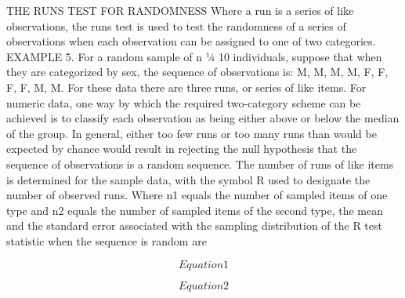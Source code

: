 THE RUNS TEST FOR RANDOMNESS
Where a run is a series of like observations, the runs test is used to test the randomness of a series of
observations when each observation can be assigned to one of two categories.
EXAMPLE 5. For a random sample of n ¼ 10 individuals, suppose that when they are categorized by sex, the sequence of
observations is: M, M, M, M, F, F, F, F, M, M. For these data there are three runs, or series of like items.
For numeric data, one way by which the required two-category scheme can be achieved is to classify each
observation as being either above or below the median of the group. In general, either too few runs or too many
runs than would be expected by chance would result in rejecting the null hypothesis that the sequence of
observations is a random sequence.
The number of runs of like items is determined for the sample data, with the symbol R used to designate the
number of observed runs. Where n1 equals the number of sampled items of one type and n2 equals the number of
sampled items of the second type, the mean and the standard error associated with the sampling distribution of
the R test statistic when the sequence is random are


\[ Equation 1 \]

\[ Equation 2\]
